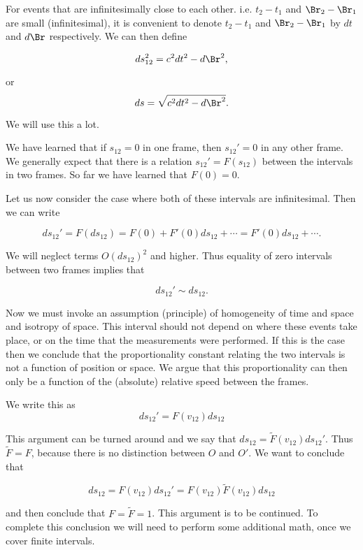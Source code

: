 For events that are infinitesimally close to each other.  i.e. \(t_2 - t_1\) and \(\Br_2 -\Br_1\) are small (infinitesimal), it is convenient to denote \(t_2 - t_1\) and \(\Br_2 - \Br_1\) by \(dt\) and \(d\Br\) respectively.  We can then define

\begin{equation}\label{eqn:relativisticElectrodynamicsL2:60}
ds_{12}^2 = c^2 dt^2 - d\Br^2,
\end{equation}

or
\begin{equation}\label{eqn:relativisticElectrodynamicsL2:60b}
ds= \sqrt{c^2 dt^2 - d\Br^2}.
\end{equation}

We will use this a lot.

We have learned that if \(s_{12} = 0\) in one frame, then \(s_{12}' = 0\) in any other frame.  We generally expect that there is a relation \(s_{12}' = F(s_12)\) between the intervals in two frames.  So far we have learned that \(F(0) = 0\). 

Let us now consider the case where both of these intervals are infinitesimal.  Then we can write

\begin{equation}\label{eqn:relativisticElectrodynamicsL2:70}
ds_{12}' = F(ds_{12}) = F(0) + F'(0) ds_{12} + \cdots = F'(0) ds_{12} + \cdots.
\end{equation}

We will neglect terms \(O(ds_{12})^2\) and higher.  Thus equality of zero intervals between two frames implies that 

\begin{equation}\label{eqn:relativisticElectrodynamicsL2:80}
ds_{12}' \sim ds_{12}.
\end{equation}

Now we must invoke an assumption (principle) of homogeneity of time and space and isotropy of space.  This interval should not depend on where these events take place, or on the time that the measurements were performed.  If this is the case then we conclude that the proportionality constant relating the two intervals is not a function of position or space.  We argue that this proportionality can then only be a function of the (absolute) relative speed between the frames.

We write this as
\begin{equation}\label{eqn:relativisticElectrodynamicsL2:90}
ds_{12}' = F(v_{12}) ds_{12}
\end{equation}

This argument can be turned around and we say that \(ds_{12} = \tilde{F}(v_{12}) ds_{12}'\).  Thus \(\tilde{F} = F\), because there is no distinction between \(O\) and \(O'\).  We want to conclude that 

\begin{equation}\label{eqn:relativisticElectrodynamicsL2:100}
ds_{12} = F(v_{12}) ds_{12}' = F(v_{12}) \tilde{F}(v_{12}) ds_{12}
\end{equation}

and then conclude that \(F = \tilde{F} = 1\).  This argument is to be continued.  To complete this conclusion we will need to perform some additional math, once we cover finite intervals.
